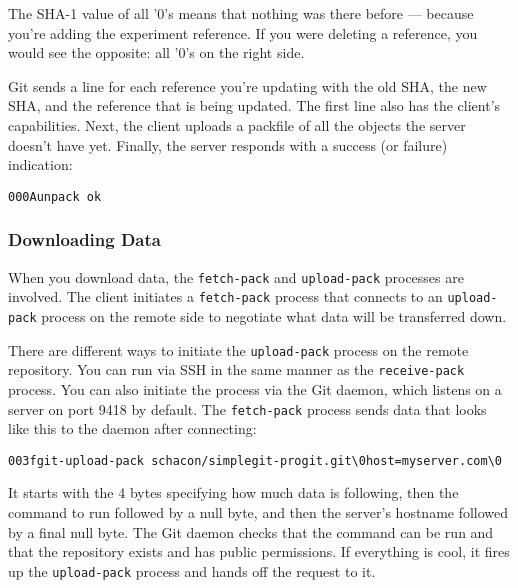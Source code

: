 \documentclass[a4paper]{book}
\begin{document}
The SHA-1 value of all '0's means that nothing was there before --- because you're adding the experiment reference. If you were deleting a reference, you would see the opposite: all '0's on the right side.

Git sends a line for each reference you're updating with the old SHA, the new SHA, and the reference that is being updated. The first line also has the client's capabilities. Next, the client uploads a packfile of all the objects the server doesn't have yet. Finally, the server responds with a success (or failure) indication:

\begin{shaded}\begin{verbatim}
000Aunpack ok
\end{verbatim}\end{shaded}

\subsubsection{Downloading Data}

When you download data, the \texttt{fetch-pack} and \texttt{upload-pack} processes are involved. The client initiates a \texttt{fetch-pack} process that connects to an \texttt{upload-pack} process on the remote side to negotiate what data will be transferred down.

There are different ways to initiate the \texttt{upload-pack} process on the remote repository. You can run via SSH in the same manner as the \texttt{receive-pack} process. You can also initiate the process via the Git daemon, which listens on a server on port 9418 by default. The \texttt{fetch-pack} process sends data that looks like this to the daemon after connecting:

\begin{shaded}\begin{verbatim}
003fgit-upload-pack schacon/simplegit-progit.git\0host=myserver.com\0
\end{verbatim}\end{shaded}

It starts with the 4 bytes specifying how much data is following, then the command to run followed by a null byte, and then the server's hostname followed by a final null byte. The Git daemon checks that the command can be run and that the repository exists and has public permissions. If everything is cool, it fires up the \texttt{upload-pack} process and hands off the request to it.
\end{document}
